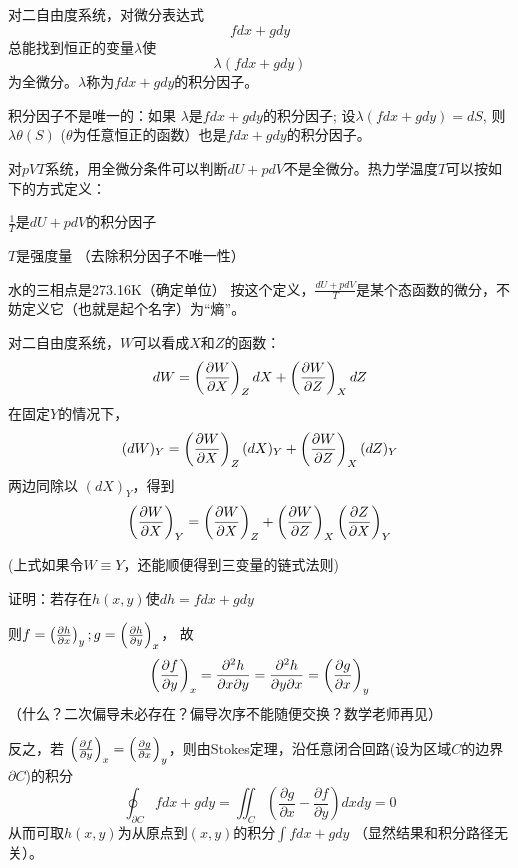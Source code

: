 \documentclass[CJK]{beamer}
\begin{document}
\begin{frame}
\bchL
对二自由度系统，对微分表达式
$$ f dx + g dy$$
总能找到恒正的变量$\lambda$使 
$$ \lambda\left( f dx + g dy \right)$$
为全微分。$\lambda$称为$f dx + g dy$的积分因子。

积分因子不是唯一的：如果 $\lambda$是$f dx + g dy$的积分因子; 设$\lambda (fdx + gdy)=dS$, 则$\lambda \theta(S)$ ($\theta$为任意恒正的函数）也是$f dx + g dy$的积分因子。
\echL
\end{frame}



\begin{frame}
\bchL
对$pVT$系统，用全微分条件可以判断$dU + p dV$不是全微分。热力学温度$T$可以按如下的方式定义：

\bitem
\item{$\frac{1}{T}$是$dU+pdV$的积分因子}
\item{$T$是强度量 （去除积分因子不唯一性）}
\item{水的三相点是273.16K（确定单位）}    
\eitem
按这个定义，$\frac{dU + pdV}{T}$是某个态函数的微分，不妨定义它（也就是起个名字）为“熵”。



\echL
\end{frame}


\begin{frame}
\bch
    {\small
      对二自由度系统，$W$可以看成$X$和$Z$的函数：
      $$ dW = \left(\frac{\partial W}{\partial X}\right)_{Z} dX + \left(\frac{\partial W}{\partial Z}\right)_{X} dZ $$
      在固定$Y$的情况下，
      $$ (dW)_Y = \left(\frac{\partial W}{\partial X}\right)_{Z} (dX)_Y + \left(\frac{\partial W}{\partial Z}\right)_{X} (dZ)_Y $$
      两边同除以 $(dX)_Y$，得到
      $$ \left(\frac{\partial W}{\partial X}\right)_{Y} = \left(\frac{\partial W}{\partial X}\right)_{Z} + \left(\frac{\partial W}{\partial Z}\right)_{X} \left(\frac{\partial Z}{\partial X}\right)_{Y}$$
      
(上式如果令$W\equiv Y$，还能顺便得到三变量的链式法则)
}
\ech
\end{frame}



\begin{frame}
\bch
{\small 
证明：若存在$h(x,y)$使$dh = f dx + g dy$

则$ f = \left(\frac{\partial h}{\partial x}\right)_{y}; g = \left(\frac{\partial h}{\partial y}\right)_{x} $， 故
$$ \left(\frac{\partial f}{\partial y}\right)_{x} = \frac{\partial^2 h}{\partial x \partial y} = \frac{\partial^2 h}{\partial y \partial x}= \left(\frac{\partial g}{\partial x}\right)_{y} $$
（什么？二次偏导未必存在？偏导次序不能随便交换？\bye 数学老师再见）

\skipline
反之，若 $\left(\frac{\partial f}{\partial y}\right)_{x} = \left(\frac{\partial g}{\partial x}\right)_{y} $，则由Stokes定理，沿任意闭合回路(设为区域$C$的边界$\partial C$)的积分
$$\oint_{\partial C} fdx + gdy = \iint_C \left(\frac{\partial g}{\partial x} -\frac{\partial f}{\partial y} \right)dxdy = 0 $$
从而可取$h(x, y)$为从原点到$(x,y)$的积分$\int fdx + gdy$ （显然结果和积分路径无关）。

}
\ech
\end{frame}
\end{document}
